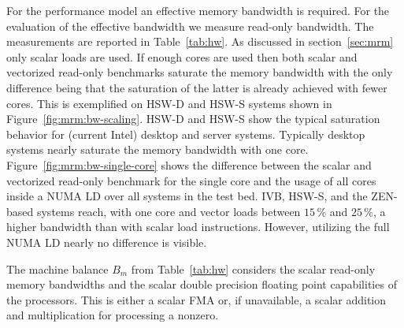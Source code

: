 {\color{blue} For the performance model an effective memory bandwidth is required.
For the evaluation of the effective bandwidth we measure read-only bandwidth.
The measurements are reported in Table~\ref{tab:hw}.}
As discussed in section~\ref{sec:mrm} only scalar loads are used.
%
If enough cores are used then both scalar and vectorized read-only benchmarks
saturate the memory bandwidth with the only difference being that the saturation of
the latter is already achieved with fewer cores. 
This is exemplified on HSW-D and HSW-S systems shown in
Figure~\ref{fig:mrm:bw-scaling}.
HSW-D and HSW-S show the typical saturation behavior for (current Intel) desktop
and server systems. 
Typically desktop systems nearly saturate the memory bandwidth with one core.
%
Figure~\ref{fig:mrm:bw-single-core} shows the difference between the scalar and
vectorized read-only benchmark for the single core and the usage of all cores
inside a NUMA LD over all systems in the test bed.
IVB, HSW-S, and the ZEN-based
systems reach,
with one core and vector loads between $15$\,\% and
$25$\,\%,
a higher bandwidth
than with scalar load instructions.
However, utilizing the full NUMA LD nearly no difference is visible.
%

The machine balance $B_m$ from Table~\ref{tab:hw} considers the scalar read-only
memory bandwidths and the scalar double precision floating point capabilities of
the processors. 
This is either a scalar FMA or, if unavailable, a scalar addition and
multiplication for processing a nonzero.

%



